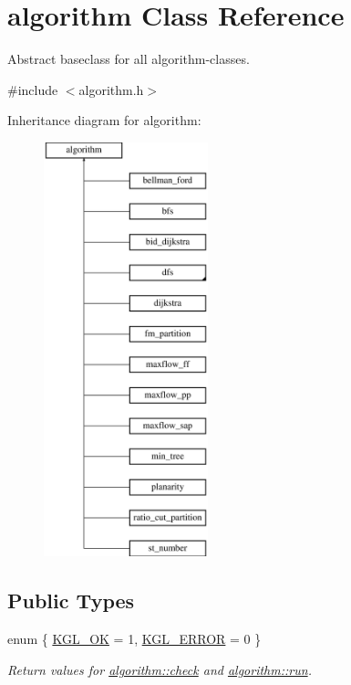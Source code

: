 \hypertarget{classalgorithm}{}\section{algorithm Class Reference}
\label{classalgorithm}


Abstract baseclass for all algorithm-\/classes.  




{\ttfamily \#include $<$algorithm.\+h$>$}

Inheritance diagram for algorithm\+:\begin{figure}[H]
\begin{center}
\leavevmode
\includegraphics[height=12.000000cm]{classalgorithm}
\end{center}
\end{figure}
\subsection*{Public Types}
\begin{DoxyCompactItemize}
\item 
enum \{ \mbox{\hyperlink{classalgorithm_af1a0078e153aa99c24f9bdf0d97f6710aae4c1cd7fe8d8cf4b143241a6e7c31cf}{K\+G\+L\+\_\+\+OK}} = 1, 
\mbox{\hyperlink{classalgorithm_af1a0078e153aa99c24f9bdf0d97f6710ae67bf27b2ef31f73e545a7f9f4a69556}{K\+G\+L\+\_\+\+E\+R\+R\+OR}} = 0
 \}
\begin{DoxyCompactList}\small\item\em Return values for \mbox{\hyperlink{classalgorithm_a05c0f25463eb35a77b2d73fc06bb2c0e}{algorithm\+::check}} and \mbox{\hyperlink{classalgorithm_a482eb28cacba018b5a86d3a819a50a2f}{algorithm\+::run}}. \end{DoxyCompactList}\end{DoxyCompactItemize}
